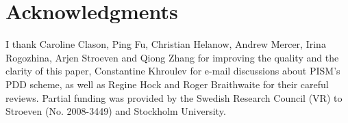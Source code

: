 \documentclass[review]{igs}
\begin{document}
\section{Acknowledgments}

I thank Caroline Clason, Ping Fu, Christian Helanow, Andrew Mercer, Irina Rogozhina, Arjen Stroeven and Qiong Zhang for improving the quality and the clarity of this paper, Constantine Khroulev for e-mail discussions about PISM's PDD scheme, as well as Regine Hock and Roger Braithwaite for their careful reviews. Partial funding was provided by the Swedish Research Council (VR) to Stroeven (No. 2008-3449) and Stockholm University.



\end{document}
